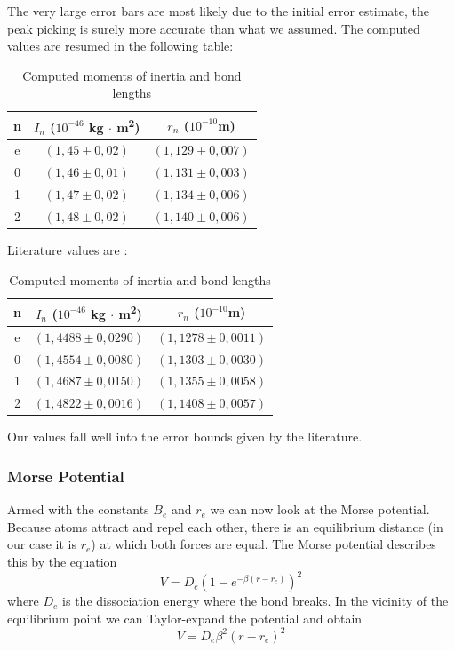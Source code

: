 \documentclass[12pt]{article}
\begin{document}
The very large error bars are most likely due to the initial error estimate, the peak picking is surely more accurate than what we assumed. The computed values are resumed in the following table:
\begin{table}[!ht]
    \centering
    \begin{tabular}{|c|c|c|}
    \hline
        n & $I_n$ ($10^{-46}$ \si{kg} $\cdot$ \si{m^2}) & $r_n$ ($10^{-10}$\si{m}) \\ \hline \hline
        e & $(1,45 \pm 0,02)$ & $(1,129 \pm 0,007)$ \\ \hline
        0 & $(1,46 \pm 0,01)$ & $(1,131 \pm 0,003)$ \\ \hline
        1 & $(1,47 \pm 0,02)$ & $(1,134 \pm 0,006)$ \\ \hline
        2 & $(1,48 \pm 0,02)$ & $(1,140 \pm 0,006)$ \\ \hline
    \end{tabular}
    \caption{Computed moments of inertia and bond lengths}
    \label{tab:MomentOfInertiaAndBondLengthValues}
\end{table}
\FloatBarrier

Literature values are \cite{doi:10.1021/ed073p804}:
\begin{table}[!ht]
    \centering
    \begin{tabular}{|c|c|c|}
    \hline
        n & $I_n$ ($10^{-46}$ \si{kg} $\cdot$ \si{m^2}) & $r_n$ ($10^{-10}$\si{m}) \\ \hline \hline
        e & $(1,4488 \pm 0,0290)$ & $(1,1278 \pm 0,0011)$ \\ \hline
        0 & $(1,4554 \pm 0,0080)$ & $(1,1303 \pm 0,0030)$ \\ \hline
        1 & $(1,4687 \pm 0,0150)$ & $(1,1355 \pm 0,0058)$ \\ \hline
        2 & $(1,4822 \pm 0,0016)$ & $(1,1408 \pm 0,0057)$ \\ \hline
    \end{tabular}
    \caption{Computed moments of inertia and bond lengths}
    \label{tab:MomentOfInertiaAndBondLengthLiteratureValues}
\end{table}
\FloatBarrier
Our values fall well into the error bounds given by the literature.

\subsubsection{Morse Potential}
Armed with the constants $B_e$ and $r_e$ we can now look at the Morse potential. Because atoms attract and repel each other, there is an equilibrium distance (in our case it is $r_e$) at which both forces are equal. The Morse potential describes this by the equation
\begin{equation}
    V = D_e \left(1 - e^{-\beta(r-r_e)} \right)^2
\end{equation}
where $D_e$ is the dissociation energy where the bond breaks. In the vicinity of the equilibrium point we can Taylor-expand the potential and obtain
\begin{equation}
    V = D_e \beta ^2 (r - r_e)^2
    \label{eq:MorsePotTaylor}
\end{equation}
\end{document}
